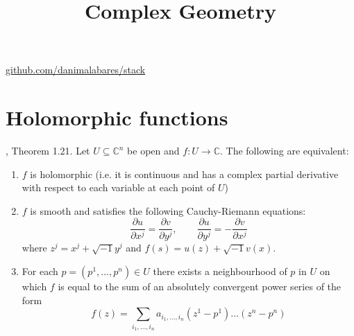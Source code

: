 



\title{Complex Geometry}
\maketitle

\label{section-phantom}
\hfill
\href{http://github.com/danimalabares/stack}{github.com/danimalabares/stack}

\tableofcontents

\section{Holomorphic functions}
\label{section-holomorphic-functions}

\begin{lemma}
\label{lemma-holomorphic-function-characterization}
\cite{lec}, Theorem 1.21. Let $U\subseteq\mathbb{C}^n$ be open and $f:U\to
\mathbb{C}$. The following are equivalent:
\begin{enumerate}
\item $f$ is holomorphic (i.e. it is continuous and has a complex partial
derivative with respect to each variable at each point of $U$)
\item $f$ is smooth and satisfies the following Cauchy-Riemann equations:
\begin{equation}
\label{equation-Cauchy-Riemann-several-variables}
\frac{\partial u}{\partial x^j}=\frac{\partial v}{\partial y^j},\qquad 
\frac{\partial u}{\partial y^j}=-\frac{\partial v}{\partial x^j}
\end{equation}
where $z^j=x^j+\sqrt{-1}y^j$ and $f(s)=u(z)+\sqrt{-1}v(x)$.
\item For each $p=(p^1,\ldots,p^n)\in U$ there exists a neighbourhood of $p$ in
$U$ on which $f$ is equal to the sum of an absolutely convergent power series of
the form
\begin{equation}
\label{equation-Taylor-series-several-variables}
f(z)=\sum_{i_1,\ldots,i_n}a_{i_1,\ldots,i_n}(z^1-p^1)\ldots(z^n-p^n)
\end{equation}
\end{enumerate}
\end{lemma}

